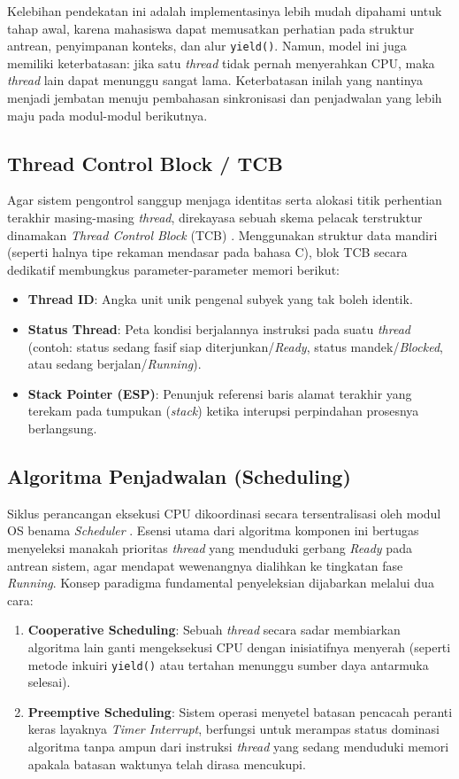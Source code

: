 Kelebihan pendekatan ini adalah implementasinya lebih mudah dipahami untuk tahap awal, karena mahasiswa dapat memusatkan perhatian pada struktur antrean, penyimpanan konteks, dan alur \texttt{yield()}. Namun, model ini juga memiliki keterbatasan: jika satu \textit{thread} tidak pernah menyerahkan CPU, maka \textit{thread} lain dapat menunggu sangat lama. Keterbatasan inilah yang nantinya menjadi jembatan menuju pembahasan sinkronisasi dan penjadwalan yang lebih maju pada modul-modul berikutnya.

\subsection{Thread Control Block / TCB}
Agar sistem pengontrol sanggup menjaga identitas serta alokasi titik perhentian terakhir masing-masing \textit{thread}, direkayasa sebuah skema pelacak terstruktur dinamakan \textit{Thread Control Block} (TCB) \cite{Silberschatz2018}. Menggunakan struktur data mandiri (seperti halnya tipe rekaman mendasar pada bahasa C), blok TCB secara dedikatif membungkus parameter-parameter memori berikut:
\begin{itemize}
	\item \textbf{Thread ID}: Angka unit unik pengenal subyek yang tak boleh identik.
	\item \textbf{Status Thread}: Peta kondisi berjalannya instruksi pada suatu \textit{thread} (contoh: status sedang fasif siap diterjunkan/\textit{Ready}, status mandek/\textit{Blocked}, atau sedang berjalan/\textit{Running}).
	\item \textbf{Stack Pointer (ESP)}: Penunjuk referensi baris alamat terakhir yang terekam pada tumpukan (\textit{stack}) ketika interupsi perpindahan prosesnya berlangsung.
\end{itemize}

\subsection{Algoritma Penjadwalan (Scheduling)}
Siklus perancangan eksekusi CPU dikoordinasi secara tersentralisasi oleh modul OS benama \textit{Scheduler} \cite{Silberschatz2018}. Esensi utama dari algoritma komponen ini bertugas menyeleksi manakah prioritas \textit{thread} yang menduduki gerbang \textit{Ready} pada antrean sistem, agar mendapat wewenangnya dialihkan ke tingkatan fase \textit{Running}. Konsep paradigma fundamental penyeleksian dijabarkan melalui dua cara:
\begin{enumerate}
	\item \textbf{Cooperative Scheduling}: Sebuah \textit{thread} secara sadar membiarkan algoritma lain ganti mengeksekusi CPU dengan inisiatifnya menyerah (seperti metode inkuiri \texttt{yield()} atau tertahan menunggu sumber daya antarmuka selesai).
	\item \textbf{Preemptive Scheduling}: Sistem operasi menyetel batasan pencacah peranti keras layaknya \textit{Timer Interrupt}, berfungsi untuk merampas status dominasi algoritma tanpa ampun dari instruksi \textit{thread} yang sedang menduduki memori apakala batasan waktunya telah dirasa mencukupi.
\end{enumerate}

